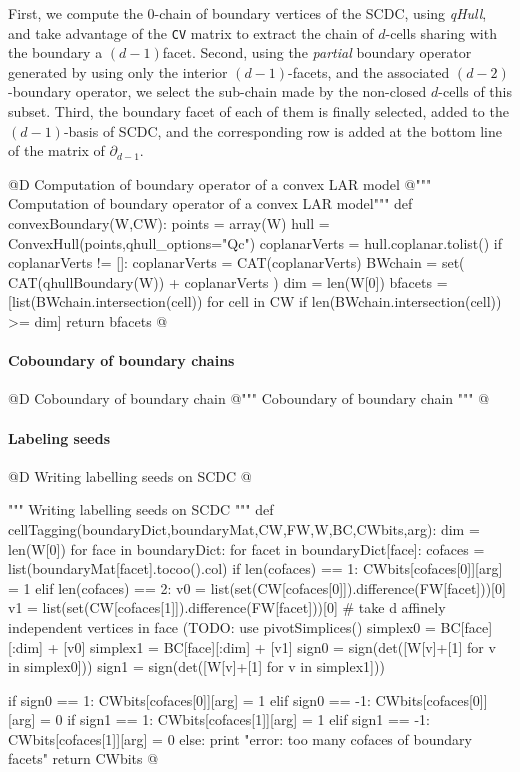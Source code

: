 \documentclass[11pt,oneside]{article}	%
\begin{document}
First, we compute the 0-chain of boundary vertices of the SCDC, using \emph{qHull}, and take advantage of the \texttt{CV} matrix to extract the chain of $d$-cells sharing with the boundary a $(d-1)$facet. Second, using the \emph{partial} boundary operator generated by using only the interior $(d-1)$-facets, and the associated $(d-2)$-boundary operator, we select the sub-chain made by the non-closed $d$-cells of this subset. Third, the boundary facet of each of them is finally selected, added to the $(d-1)$-basis of SCDC, and the corresponding row is added at the bottom line of the matrix of $\partial_{d-1}$.

@D Computation of boundary operator of a convex LAR model
@{""" Computation of boundary operator of a convex LAR model"""
def convexBoundary(W,CW):
	points = array(W)
	hull = ConvexHull(points,qhull_options="Qc")
	coplanarVerts = hull.coplanar.tolist()
	if coplanarVerts != []:  coplanarVerts = CAT(coplanarVerts)
	BWchain = set( CAT(qhullBoundary(W)) + coplanarVerts )
	dim = len(W[0])
	bfacets = [list(BWchain.intersection(cell)) 
					for cell in CW if len(BWchain.intersection(cell)) >= dim]
	return bfacets
@}


\paragraph{Coboundary of boundary chains}

@D Coboundary of boundary chain
@{""" Coboundary of boundary chain """
@}


\paragraph{Labeling seeds}

@D Writing labelling seeds on SCDC
@{""" Writing labelling seeds on SCDC """
def cellTagging(boundaryDict,boundaryMat,CW,FW,W,BC,CWbits,arg):
	dim = len(W[0])
	for face in boundaryDict:
		for facet in boundaryDict[face]:
			cofaces = list(boundaryMat[facet].tocoo().col)
			if len(cofaces) == 1: 
				CWbits[cofaces[0]][arg] = 1
			elif len(cofaces) == 2:
				v0 = list(set(CW[cofaces[0]]).difference(FW[facet]))[0]
				v1 = list(set(CW[cofaces[1]]).difference(FW[facet]))[0]
				# take d affinely independent vertices in face (TODO: use pivotSimplices() 
				simplex0 = BC[face][:dim] + [v0]
				simplex1 = BC[face][:dim] + [v1]
				sign0 = sign(det([W[v]+[1] for v in simplex0]))
				sign1 = sign(det([W[v]+[1] for v in simplex1]))
				
				if sign0 == 1: CWbits[cofaces[0]][arg] = 1
				elif sign0 == -1: CWbits[cofaces[0]][arg] = 0
				if sign1 == 1: CWbits[cofaces[1]][arg] = 1
				elif sign1 == -1: CWbits[cofaces[1]][arg] = 0
			else: 
				print "error: too many cofaces of boundary facets"
	return CWbits
@}
\end{document}
